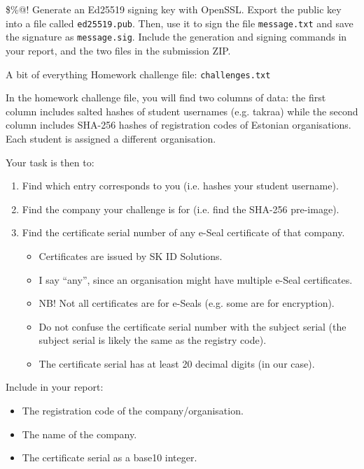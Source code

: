 \documentclass{homework}
\begin{document}
\begin{task}{\$\%@!}
  Generate an Ed25519 signing key with OpenSSL.
  Export the public key into a file called \texttt{ed25519.pub}.
  Then, use it to sign the file \texttt{message.txt} and save the signature as \texttt{message.sig}.
  Include the generation and signing commands in your report, and the two files in the submission ZIP.
\end{task}

\newpage

\begin{task}{A bit of everything}
  Homework challenge file: \texttt{challenges.txt}

  In the homework challenge file, you will find two columns of data: the first column includes salted hashes of student usernames (e.g. takraa) while the second column includes SHA-256 hashes of registration codes of Estonian organisations.
  Each student is assigned a different organisation.

  Your task is then to:
  \begin{enumerate}
    \item Find which entry corresponds to you (i.e. hashes your student username).
    \item Find the company your challenge is for (i.e. find the SHA-256 pre-image).
    \item Find the certificate serial number of any e-Seal certificate of that company.
    \begin{itemize}
      \item Certificates are issued by SK ID Solutions.
      \item I say \enquote{any}, since an organisation might have multiple e-Seal certificates.
      \item NB! Not all certificates are for e-Seals (e.g. some are for encryption).
      \item Do not confuse the certificate serial number with the subject serial (the subject serial is likely the same as the registry code).
      \item The certificate serial has at least 20 decimal digits (in our case).
    \end{itemize}
  \end{enumerate}

  Include in your report:
  \begin{itemize}
    \item The registration code of the company/organisation.
    \item The name of the company.
    \item The certificate serial as a base10 integer.
  \end{itemize}


\end{task}
\end{document}
